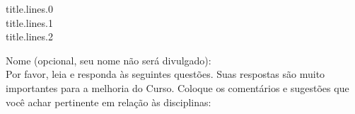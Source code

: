 \documentclass{article}
\begin{document}
        \thispagestyle{empty}
        \begin{center}
            {{title.lines.0}} \\
            {{title.lines.1}} \\
            {{title.lines.2}}
        \end{center}
        \begin{flushleft}
            Nome (opcional, seu nome não será divulgado): \leaders \vrule height 2.0pt depth -1.5pt \hfill \null \\
            \hspace{1cm}Por favor, leia e responda às seguintes questões. Suas respostas são muito importantes para a melhoria do Curso.
            Coloque os comentários e sugestões que você achar pertinente em relação às disciplinas:
        \end{flushleft}
\end{document}
